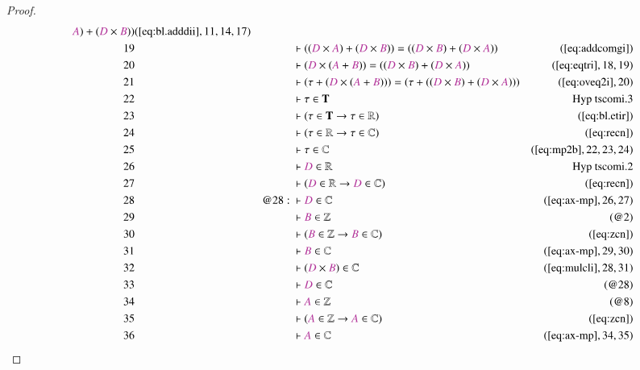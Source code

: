 \begin{proof}
\begin{align}
      \mc{A} ) + ( \mc{D} \times \mc{B} )
      )&(\mbox{\ref{eq:bl.adddii}},11,14,17)\notag
  \\ 19 &&  & \vdash ( ( \mc{D} \times \mc{A} ) + ( \mc{D} \times \mc{B} ) ) = (
      ( \mc{D} \times \mc{B} ) + ( \mc{D} \times \mc{A} )
      )&(\mbox{\ref{eq:addcomgi}})\notag
  \\ 20 &&  & \vdash ( \mc{D} \times ( \mc{A} + \mc{B} ) ) = ( ( \mc{D} \times
      \mc{B} ) + ( \mc{D} \times \mc{A} )
      )&(\mbox{\ref{eq:eqtri}},18,19)\notag
  \\ 21 &&  & \vdash ( \tau + ( \mc{D} \times ( \mc{A} + \mc{B} ) ) ) = ( \tau +
      ( ( \mc{D} \times \mc{B} ) + ( \mc{D} \times \mc{A} ) )
      )&(\mbox{\ref{eq:oveq2i}},20)\notag
  \\ 22 &&  & \vdash \tau \in \mathbf{T}&\text{Hyp~tscomi.3}\notag%
  \\ 23 &&  & \vdash ( \tau \in \mathbf{T} \rightarrow \tau \in \mathbb{R}
      )&(\mbox{\ref{eq:bl.etir}})\notag
  \\ 24 &&  & \vdash ( \tau \in \mathbb{R} \rightarrow \tau \in \mathbb{C}
      )&(\mbox{\ref{eq:recn}})\notag
  \\ 25 &&  & \vdash \tau \in \mathbb{C}&(\mbox{\ref{eq:mp2b}},22,23,24)\notag
  \\ 26 &&  & \vdash \mc{D} \in
      \mathbb{R}&\text{Hyp~tscomi.2}\notag%
  \\ 27 &&  & \vdash ( \mc{D} \in \mathbb{R} \rightarrow \mc{D} \in \mathbb{C}
      )&(\mbox{\ref{eq:recn}})\notag
  \\ 28 && @28:\  & \vdash \mc{D} \in
      \mathbb{C}&(\mbox{\ref{eq:ax-mp}},26,27)\notag
  \\ 29 &&  & \vdash \mc{B} \in \mathbb{Z}&(@2)\notag
  \\ 30 &&  & \vdash ( \mc{B} \in \mathbb{Z} \rightarrow \mc{B} \in \mathbb{C}
      )&(\mbox{\ref{eq:zcn}})\notag
  \\ 31 &&  & \vdash \mc{B} \in \mathbb{C}&(\mbox{\ref{eq:ax-mp}},29,30)\notag
  \\ 32 &&  & \vdash ( \mc{D} \times \mc{B} ) \in
      \mathbb{C}&(\mbox{\ref{eq:mulcli}},28,31)\notag
  \\ 33 &&  & \vdash \mc{D} \in \mathbb{C}&(@28)\notag
  \\ 34 &&  & \vdash \mc{A} \in \mathbb{Z}&(@8)\notag
  \\ 35 &&  & \vdash ( \mc{A} \in \mathbb{Z} \rightarrow \mc{A} \in \mathbb{C}
      )&(\mbox{\ref{eq:zcn}})\notag
  \\ 36 &&  & \vdash \mc{A} \in \mathbb{C}&(\mbox{\ref{eq:ax-mp}},34,35)\notag

\end{align}
\end{proof}

